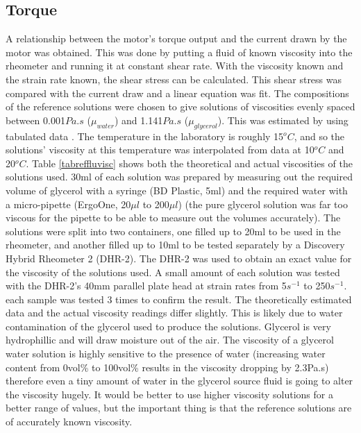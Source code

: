 \documentclass[twoside,a4]{report}
\def\br{\newline \newline \noindent}
\begin{document}
	\subsection*{Torque}
	A relationship between the motor's torque output and the current drawn by the motor was obtained. This was done by putting a fluid of known viscosity into the rheometer and running it at constant shear rate. With the viscosity known and the strain rate known, the shear stress can be calculated. This shear stress was compared with the current draw and a linear equation was fit. \br
	The compositions of the reference solutions were chosen to give solutions of viscosities evenly spaced between 0.001$Pa.s$ ($\mu_{water}$) and 1.141$Pa.s$ ($\mu_{glycerol}$). This was estimated by using tabulated data \cite{seguroberglycsolvisc}. The temperature in the laboratory is roughly 15$^oC$, and so the solutions' viscosity at this temperature was interpolated from data at 10$^oC$ and 20$^oC$. Table \ref{tabreffluvisc} shows both the theoretical and actual viscosities of the solutions used. 30ml of each solution was prepared by measuring out the required volume of glycerol with a syringe (BD Plastic, 5ml) and the required water with a micro-pipette (ErgoOne, 20$\mu l$ to 200$\mu l$) (the pure glycerol solution was far too viscous for the pipette to be able to measure out the volumes accurately). The solutions were split into two containers, one filled up to 20ml to be used in the rheometer, and another filled up to 10ml to be tested separately by a Discovery Hybrid Rheometer 2 (DHR-2). \br
	The DHR-2 was used to obtain an exact value for the viscosity of the solutions used. A small amount of each solution was tested with the DHR-2's 40mm parallel plate head at strain rates from 5$s^{-1}$ to 250$s^{-1}$. each sample was tested 3 times to confirm the result. The theoretically estimated data and the actual viscosity readings differ slightly. This is likely due to water contamination of the glycerol used to produce the solutions. Glycerol is very hydrophillic and will draw moisture out of the air. The viscosity of a glycerol water solution is highly sensitive to the presence of water (increasing water content from 0vol\% to 100vol\% results in the viscosity dropping by 2.3Pa.s) therefore even a tiny amount of water in the glycerol source fluid is going to alter the viscosity hugely. It would be better to use higher viscosity solutions for a better range of values, but the important thing is that the reference solutions are of accurately known viscosity. \newline
\end{document}
